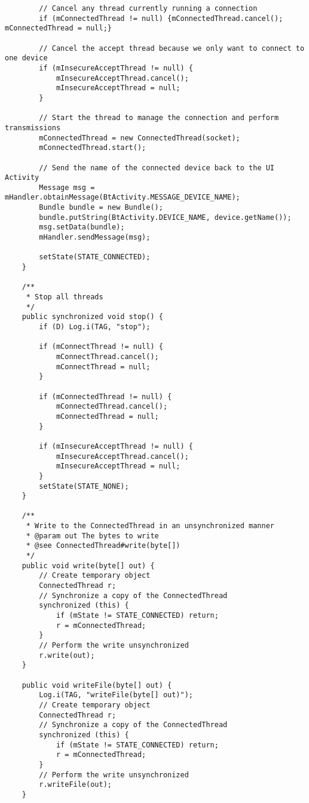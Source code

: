 \begin{verbatim}
        // Cancel any thread currently running a connection
        if (mConnectedThread != null) {mConnectedThread.cancel(); mConnectedThread = null;}

        // Cancel the accept thread because we only want to connect to one device
        if (mInsecureAcceptThread != null) {
            mInsecureAcceptThread.cancel();
            mInsecureAcceptThread = null;
        }

        // Start the thread to manage the connection and perform transmissions
        mConnectedThread = new ConnectedThread(socket);
        mConnectedThread.start();

        // Send the name of the connected device back to the UI Activity
        Message msg = mHandler.obtainMessage(BtActivity.MESSAGE_DEVICE_NAME);
        Bundle bundle = new Bundle();
        bundle.putString(BtActivity.DEVICE_NAME, device.getName());
        msg.setData(bundle);
        mHandler.sendMessage(msg);

        setState(STATE_CONNECTED);
    }

    /**
     * Stop all threads
     */
    public synchronized void stop() {
        if (D) Log.i(TAG, "stop");

        if (mConnectThread != null) {
            mConnectThread.cancel();
            mConnectThread = null;
        }

        if (mConnectedThread != null) {
            mConnectedThread.cancel();
            mConnectedThread = null;
        }

        if (mInsecureAcceptThread != null) {
            mInsecureAcceptThread.cancel();
            mInsecureAcceptThread = null;
        }
        setState(STATE_NONE);
    }

    /**
     * Write to the ConnectedThread in an unsynchronized manner
     * @param out The bytes to write
     * @see ConnectedThread#write(byte[])
     */
    public void write(byte[] out) {
        // Create temporary object
        ConnectedThread r;
        // Synchronize a copy of the ConnectedThread
        synchronized (this) {
            if (mState != STATE_CONNECTED) return;
            r = mConnectedThread;
        }
        // Perform the write unsynchronized
        r.write(out);
    }

    public void writeFile(byte[] out) {
        Log.i(TAG, "writeFile(byte[] out)");
        // Create temporary object
        ConnectedThread r;
        // Synchronize a copy of the ConnectedThread
        synchronized (this) {
            if (mState != STATE_CONNECTED) return;
            r = mConnectedThread;
        }
        // Perform the write unsynchronized
        r.writeFile(out);
    }


\end{verbatim}
